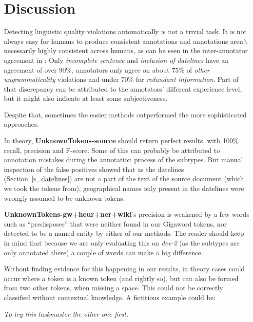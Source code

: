\documentclass[a4paper,10pt]{scrartcl}
\theoremstyle{style}
\begin{document}
\newpage
\section{Discussion}
\label{discussion}
Detecting linguistic quality violations automatically is not a trivial task. It is not always easy for humans to produce consistent annotations and annotations aren't necessarily highly consistent across humans, as can be seen in the inter-annotator agreement in \cite{friedrichlqvsumm}: Only \textit{incomplete sentence} and \textit{inclusion of datelines} have an agreement of over 90\%, annotators only agree on about 75\% of \textit{other ungrammaticality} violations and under 70\% for \textit{redundant information}. Part of that discrepancy can be attributed to the annotators' different experience level, but it might also indicate at least some subjectiveness.

Despite that, sometimes the easier methods outperformed the more sophisticated approaches.

In theory, \textbf{UnknownTokens-source} should return perfect results, with 100\% recall, precision and F-score. Some of this can probably be attributed to annotation mistakes during the annotation process of the subtypes. But manual inspection of the false positives showed that as the datelines (Section~\ref{s_datelines}) are not a part of the text of the source document (which we took the tokens from), geographical names only present in the datelines were wrongly assumed to be unknown tokens.

\textbf{UnknownTokens-gw+heur+ner+wiki}'s precision is weakened by a few words such as ``predisposes'' that were neither found in our Gigaword tokens, nor detected to be a named entity by either of our methods. The reader should keep in mind that because we are only evaluating this on \textit{dev-2} (as the subtypes are only annotated there) a couple of words can make a big difference.

Without finding evidence for this happening in our results, in theory cases could occur where a token is a known token (and rightly so), but can also be formed from two other tokens, when missing a space. This could not be correctly classified without contextual knowledge. A fictitious example could be:

\begin{framed}
\quad\textit{To try this taskmaster the other one first.}
\end{framed}
\end{document}
